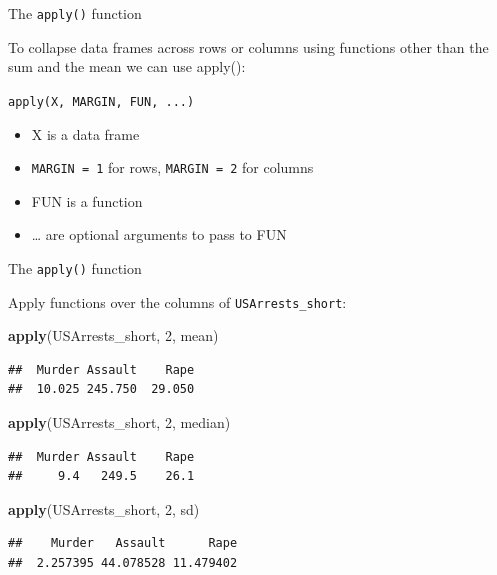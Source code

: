 \documentclass[ignorenonframetext,]{beamer}
\newenvironment{Shaded}{\begin{snugshade}}{\end{snugshade}}
\newcommand{\DecValTok}[1]{\textcolor[rgb]{0.00,0.00,0.81}{#1}}
\newcommand{\KeywordTok}[1]{\textcolor[rgb]{0.13,0.29,0.53}{\textbf{#1}}}
\newcommand{\NormalTok}[1]{#1}
\providecommand{\tightlist}{%
  \setlength{\itemsep}{0pt}\setlength{\parskip}{0pt}}
\begin{document}
\begin{frame}[fragile]{The \texttt{apply()} function}
\protect\hypertarget{the-apply-function}{}

To collapse data frames across rows or columns using functions other
than the sum and the mean we can use apply():

\texttt{apply(X,\ MARGIN,\ FUN,\ ...)}

\begin{itemize}
\tightlist
\item
  X is a data frame
\item
  \texttt{MARGIN\ =\ 1} for rows, \texttt{MARGIN\ =\ 2} for columns
\item
  FUN is a function
\item
  \ldots{} are optional arguments to pass to FUN
\end{itemize}

\end{frame}

\begin{frame}[fragile]{The \texttt{apply()} function}
\protect\hypertarget{the-apply-function-1}{}

Apply functions over the columns of \texttt{USArrests\_short}:

\begin{Shaded}
\begin{Highlighting}[]
\KeywordTok{apply}\NormalTok{(USArrests_short, }\DecValTok{2}\NormalTok{, mean)}
\end{Highlighting}
\end{Shaded}

\begin{verbatim}
##  Murder Assault    Rape 
##  10.025 245.750  29.050
\end{verbatim}

\begin{Shaded}
\begin{Highlighting}[]
\KeywordTok{apply}\NormalTok{(USArrests_short, }\DecValTok{2}\NormalTok{, median)}
\end{Highlighting}
\end{Shaded}

\begin{verbatim}
##  Murder Assault    Rape 
##     9.4   249.5    26.1
\end{verbatim}

\begin{Shaded}
\begin{Highlighting}[]
\KeywordTok{apply}\NormalTok{(USArrests_short, }\DecValTok{2}\NormalTok{, sd)}
\end{Highlighting}
\end{Shaded}

\begin{verbatim}
##    Murder   Assault      Rape 
##  2.257395 44.078528 11.479402
\end{verbatim}

\end{frame}
\end{document}
